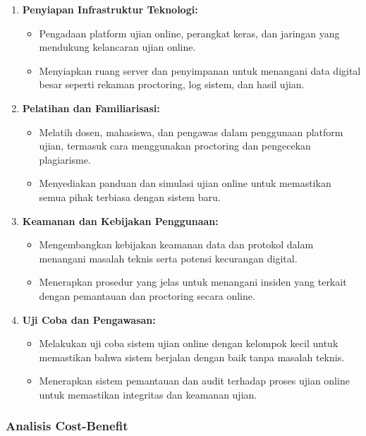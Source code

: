 \begin{enumerate}
	\item \textbf{Penyiapan Infrastruktur Teknologi:}
	\begin{itemize}
		\item Pengadaan platform ujian online, perangkat keras, dan jaringan yang mendukung kelancaran ujian online.
		\item Menyiapkan ruang server dan penyimpanan untuk menangani data digital besar seperti rekaman proctoring, log sistem, dan hasil ujian.
	\end{itemize}
	\item \textbf{Pelatihan dan Familiarisasi:}
	\begin{itemize}
		\item Melatih dosen, mahasiswa, dan pengawas dalam penggunaan platform ujian, termasuk cara menggunakan proctoring dan pengecekan plagiarisme.
		\item Menyediakan panduan dan simulasi ujian online untuk memastikan semua pihak terbiasa dengan sistem baru.
	\end{itemize}
	\item \textbf{Keamanan dan Kebijakan Penggunaan:}
	\begin{itemize}
		\item Mengembangkan kebijakan keamanan data dan protokol dalam menangani masalah teknis serta potensi kecurangan digital.
		\item Menerapkan prosedur yang jelas untuk menangani insiden yang terkait dengan pemantauan dan proctoring secara online.
	\end{itemize}
	\item \textbf{Uji Coba dan Pengawasan:}
	\begin{itemize}
		\item Melakukan uji coba sistem ujian online dengan kelompok kecil untuk memastikan bahwa sistem berjalan dengan baik tanpa masalah teknis.
		\item Menerapkan sistem pemantauan dan audit terhadap proses ujian online untuk memastikan integritas dan keamanan ujian.
	\end{itemize}
\end{enumerate}

\subsubsection{Analisis Cost-Benefit}

